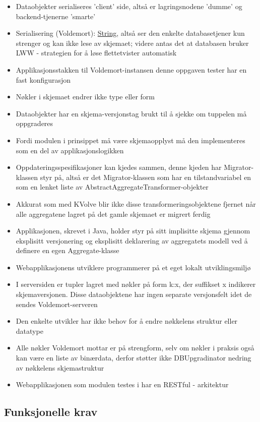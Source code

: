 \begin{itemize}
  \item Dataobjekter serialiseres 'client' side, altså er lagringsnodene 'dumme' og backend-tjenerne 'smarte'
  \item Serialisering (Voldemort): \underline{String}, altså ser den enkelte databasetjener kun strenger og kan ikke lese av skjemaet; videre antas det at databasen bruker LWW - strategien for å løse flettetvister automatisk
  \item Applikasjonsstakken til Voldemort-instansen denne oppgaven tester har en fast konfigurasjon
  \item Nøkler i skjemaet endrer ikke type eller form
  \item Dataobjekter har en skjema-versjonstag brukt til å sjekke om tuppelen må oppgraderes
  \item Fordi modulen i prinsippet må være skjemaopplyst må den implementeres som en del av applikasjonslogikken
  \item Oppdateringsspesifikasjoner kan kjedes sammen, denne kjeden har Migrator-klassen styr på, altså er det Migrator-klassen som har en tilstandvariabel en som en lenket liste av AbstractAggregateTransformer-objekter
  \item Akkurat som med KVolve blir ikke disse transformeringsobjektene fjernet når alle aggregatene lagret på det gamle skjemaet er migrert ferdig
  \item Applikasjonen, skrevet i Java, holder styr på sitt implisitte skjema gjennom eksplisitt versjonering og eksplisitt deklarering av aggregatets modell ved å definere en egen Aggregate-klasse
  \item Webapplikasjonens utviklere programmerer på et eget lokalt utviklingsmiljø
  \item I serversiden er tupler lagret med nøkler på form k:x, der suffikset x indikerer skjemaversjonen. Disse dataobjektene har ingen separate versjonsfelt idet de sendes Voldemort-serveren
  \item Den enkelte utvikler har ikke behov for å endre nøkkelens struktur eller datatype
  \item Alle nøkler Voldemort mottar er på strengform, selv om nøkler i praksis også kan være en liste av binærdata, derfor støtter ikke DBUpgradinator nedring av nøkkelens skjemastruktur
  \item Webapplikasjonen som modulen testes i har en RESTful - arkitektur
\end{itemize}

\subsection{Funksjonelle krav}

